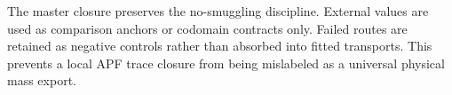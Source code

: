 The master closure preserves the no-smuggling discipline.  External values are used as comparison anchors or codomain contracts only.  Failed routes are retained as negative controls rather than absorbed into fitted transports.  This prevents a local APF trace closure from being mislabeled as a universal physical mass export.

\begin{center}
\end{center}
